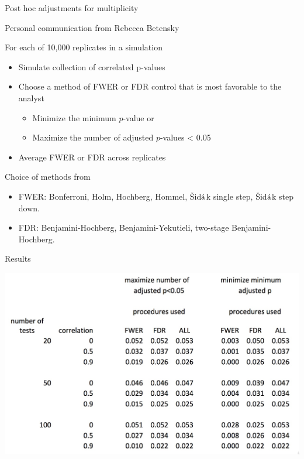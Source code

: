 \documentclass[ignorenonframetext,]{beamer}
\providecommand{\tightlist}{%
  \setlength{\itemsep}{0pt}\setlength{\parskip}{0pt}}
\begin{document}
\begin{frame}{Post hoc adjustments for multiplicity}
\protect\hypertarget{post-hoc-adjustments-for-multiplicity}{}

\small

Personal communication from Rebecca Betensky

For each of 10,000 replicates in a simulation

\begin{itemize}
\item
  Simulate collection of correlated p-values\\
\item
  Choose a method of FWER or FDR control that is most favorable to the
  analyst

  \begin{itemize}
  \tightlist
  \item
    Minimize the minimum \(p\)-value or\\
  \item
    Maximize the number of adjusted \(p\)-values \textless{} 0.05
  \end{itemize}
\item
  Average FWER or FDR across replicates
\end{itemize}

Choice of methods from

\begin{itemize}
\item
  FWER: Bonferroni, Holm, Hochberg, Hommel,
  \v{S}id\(\acute{\textrm a}\)k single step,
  \v{S}id\(\acute{\textrm a}\)k step down.
\item
  FDR: Benjamini-Hochberg, Benjamini-Yekutieli, two-stage
  Benjamini-Hochberg.
\end{itemize}

\end{frame}

\begin{frame}{Results}
\protect\hypertarget{results}{}

\centering

\includegraphics{../figures/rb_table.jpeg}

\end{frame}
\end{document}
